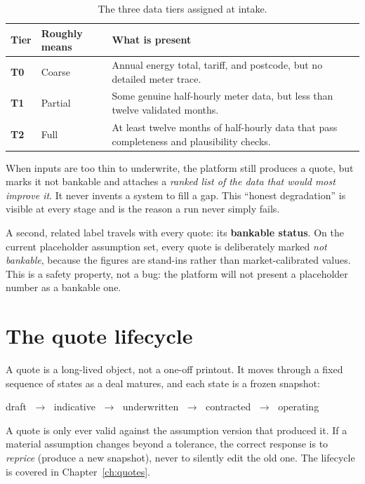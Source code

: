 \begin{table}[H]
\centering
\caption{The three data tiers assigned at intake.}
\label{tab:tiers}
\small\sffamily
\begin{tabularx}{\textwidth}{@{}l l L@{}}
\toprule
\textbf{Tier} & \textbf{Roughly means} & \textbf{What is present} \\
\midrule
\textbf{T0} & Coarse & Annual energy total, tariff, and postcode, but no detailed meter trace. \\
\textbf{T1} & Partial & Some genuine half-hourly meter data, but less than twelve validated months. \\
\textbf{T2} & Full & At least twelve months of half-hourly data that pass completeness and plausibility checks. \\
\bottomrule
\end{tabularx}
\end{table}

\begin{keyidea}
When inputs are too thin to underwrite, the platform still produces a quote, but marks it not bankable and attaches a \emph{ranked list of the data that would most improve it}. It never invents a system to fill a gap. This ``honest degradation'' is visible at every stage and is the reason a run never simply fails.
\end{keyidea}

A second, related label travels with every quote: its \textbf{bankable status}. On the current placeholder assumption set, every quote is deliberately marked \emph{not bankable}, because the figures are stand-ins rather than market-calibrated values. This is a safety property, not a bug: the platform will not present a placeholder number as a bankable one.

\section{The quote lifecycle}

A quote is a long-lived object, not a one-off printout. It moves through a fixed sequence of states as a deal matures, and each state is a frozen snapshot:

\begin{center}\sffamily\small
draft $\;\rightarrow\;$ indicative $\;\rightarrow\;$ underwritten $\;\rightarrow\;$ contracted $\;\rightarrow\;$ operating
\end{center}

A quote is only ever valid against the assumption version that produced it. If a material assumption changes beyond a tolerance, the correct response is to \emph{reprice} (produce a new snapshot), never to silently edit the old one. The lifecycle is covered in Chapter~\ref{ch:quotes}.

